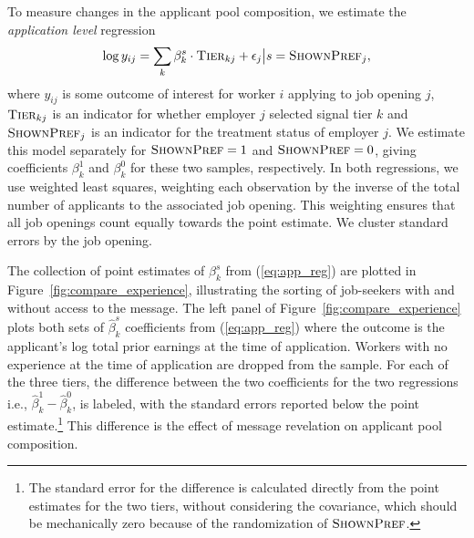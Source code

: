 \documentclass[12pt]{article}
\begin{document}
To measure changes in the applicant pool composition, we estimate the \emph{application level} regression 
\begin{align} \label{eq:app_reg}
 \log y_{ij} = \sum_k \beta^s_k \cdot \textsc{Tier}_{kj} + \epsilon_j \big| s = \textsc{ShownPref}_{j}, 
\end{align}
where $y_{ij}$ is some outcome of interest for worker $i$ applying to job opening $j$, $\textsc{Tier}_{kj}$ is an indicator for whether employer $j$ selected signal tier $k$ and $\textsc{ShownPref}_j$ is an indicator for the treatment status of employer $j$. 
We estimate this model separately for $\textsc{ShownPref} = 1$ and ${\textsc{ShownPref} = 0}$, giving coefficients $\beta^1_k$ and $\beta^0_k$ for these two samples, respectively.
In both regressions,  we use weighted least squares, weighting each observation by the inverse of the total number of applicants to the associated job opening.
This weighting ensures that all job openings count equally towards the point estimate. 
We cluster standard errors by the job opening. 

The collection of point estimates of $\beta^s_k$ from (\ref{eq:app_reg}) are plotted in Figure~\ref{fig:compare_experience}, illustrating the sorting of job-seekers with and without access to the message.
The left panel of Figure~\ref{fig:compare_experience} plots both sets of $\hat{\beta}^s_k$ coefficients from (\ref{eq:app_reg}) where the outcome is the applicant's log total prior earnings at the time of application.
Workers with no experience at the time of application are dropped from the sample. 
For each of the three tiers, the difference between the two coefficients for the two regressions i.e., $\hat{\beta}_k^1 - \hat{\beta}^0_k$, is labeled, with the standard errors reported below the point estimate.\footnote{
  The standard error for the difference is calculated directly from the point estimates for the two tiers, without considering the covariance, which should be mechanically zero because of the randomization of $\textsc{ShownPref}$.
}
This difference is the effect of message revelation on applicant pool composition.
\end{document}
